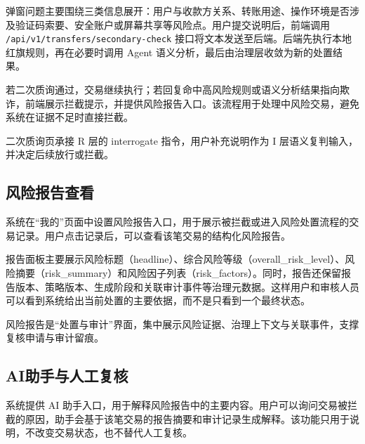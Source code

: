 \documentclass{xduugthesis}
\begin{document}
弹窗问题主要围绕三类信息展开：用户与收款方关系、转账用途、操作环境是否涉及验证码索要、安全账户或屏幕共享等风险点。用户提交说明后，前端调用 \texttt{/api/v1/transfers/secondary-check} 接口将文本发送至后端。后端先执行本地红旗规则，再在必要时调用 Agent 语义分析，最后由治理层收敛为新的处置结果。

若二次质询通过，交易继续执行；若回复命中高风险规则或语义分析结果指向欺诈，前端展示拦截提示，并提供风险报告入口。该流程用于处理中风险交易，避免系统在证据不足时直接拦截。

二次质询页承接 R 层的 interrogate 指令，用户补充说明作为 I 层语义复判输入，并决定后续放行或拦截。


\subsection{风险报告查看}

系统在“我的”页面中设置风险报告入口，用于展示被拦截或进入风险处置流程的交易记录。用户点击记录后，可以查看该笔交易的结构化风险报告。

报告面板主要展示风险标题（headline）、综合风险等级（overall\_risk\_level）、风险摘要（risk\_summary）和风险因子列表（risk\_factors）。同时，报告还保留报告版本、策略版本、生成阶段和关联审计事件等治理元数据。这样用户和审核人员可以看到系统给出当前处置的主要依据，而不是只看到一个最终状态。

风险报告是“处置与审计”界面，集中展示风险证据、治理上下文与关联事件，支撑复核申请与审计留痕。


\subsection{AI助手与人工复核}

系统提供 AI 助手入口，用于解释风险报告中的主要内容。用户可以询问交易被拦截的原因，助手会基于该笔交易的报告摘要和审计记录生成解释。该功能只用于说明，不改变交易状态，也不替代人工复核。
\end{document}
